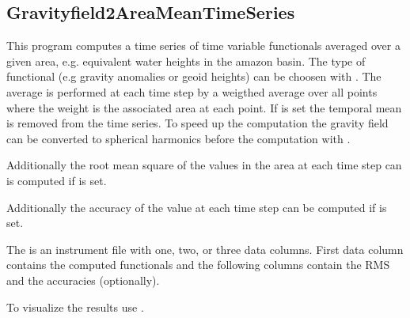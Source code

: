 \subsection{Gravityfield2AreaMeanTimeSeries}\label{Gravityfield2AreaMeanTimeSeries}
This program computes a time series of time variable
 functionals averaged over a given area,
e.g. equivalent water heights in the amazon basin.  The type of functional
(e.g gravity anomalies or geoid heights) can be choosen with .
The average is performed at each time step by a weigthed average over all 
points where the weight is the associated area at each point. If  is set
the temporal mean is removed from the time series. To speed up the computation
the gravity field can be converted to spherical harmonics before the computation
with .

Additionally the root mean square of the values in the area at each time step
can is computed if  is set.

Additionally the accuracy of the value at each time step can be computed if  is set.

The  is an instrument file with one, two, or three data columns.
First data column contains the computed functionals and the following columns contain the RMS and the accuracies (optionally).

To visualize the results use .



